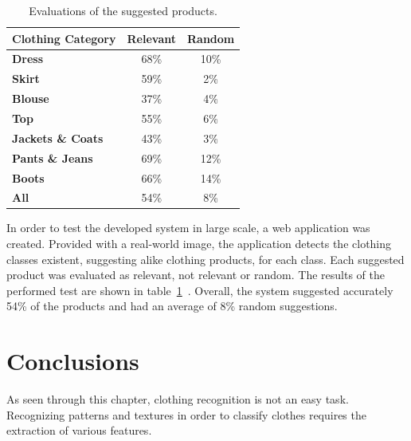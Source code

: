 \documentclass[titlepage,12pt,a4paper,times]{book}
\begin{document}
\begin{table}[!h]
\centering
\begin{tabular}{|l|c|c|}
\hline
\textbf{Clothing Category} & \textbf{Relevant} & \textbf{Random}\\
\hline
\hline
\textbf{Dress} & 68\% & 10\% \\
\hline
\textbf{Skirt} & 59\% & 2\% \\
\hline
\textbf{Blouse} & 37\% & 4\% \\
\hline
\textbf{Top} & 55\% & 6\% \\
\hline
\textbf{Jackets \& Coats} & 43\% & 3\% \\
\hline
\textbf{Pants \& Jeans} & 69\% & 12\% \\
\hline
\textbf{Boots} & 66\% & 14\% \\
\hline
\hline
\textbf{All} & 54\% & 8\% \\
\hline
\end{tabular}
\caption{Evaluations of the suggested products.}
\label{tab:uesp}
\end{table}
\FloatBarrier

In order to test the developed system in large scale, a web application was
created. Provided with a real-world image, the application detects the clothing
classes existent, suggesting alike clothing products, for each class. Each
suggested product was evaluated as relevant, not relevant or random. The
results of the performed test are shown in table~\ref{tab:uesp}~\citep{3}.
Overall, the system suggested accurately 54\% of the products and had an
average of 8\% random suggestions.



\section{Conclusions}
\label{chap2:sec:concs}

As seen through this chapter, clothing recognition is not an easy task.
Recognizing patterns and textures in order to classify clothes requires the
extraction of various features.
\end{document}
